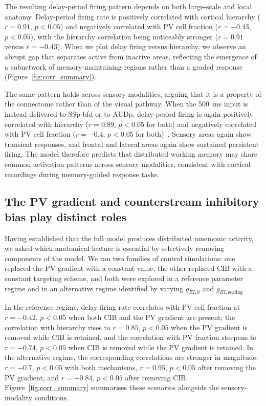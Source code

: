 \documentclass[11pt]{article}
\begin{document}
The resulting delay-period firing pattern depends on both large-scale and local anatomy. Delay-period firing rate is positively correlated with cortical hierarchy ($r=0.91$, $p<0.05$) and negatively correlated with PV cell fraction ($r=-0.43$, $p<0.05$), with the hierarchy correlation being noticeably stronger ($r=0.91$ versus $r=-0.43$). When we plot delay firing versus hierarchy, we observe an abrupt gap that separates active from inactive areas, reflecting the emergence of a subnetwork of memory-maintaining regions rather than a graded response (Figure~\ref{fig:corr_summary}).

The same pattern holds across sensory modalities, arguing that it is a property of the connectome rather than of the visual pathway. When the 500~ms input is instead delivered to SSp-bfd or to AUDp, delay-period firing is again positively correlated with hierarchy ($r=0.89$, $p<0.05$ for both) and negatively correlated with PV cell fraction ($r=-0.4$, $p<0.05$ for both)~\cite{gilad2018behavioral}. Sensory areas again show transient responses, and frontal and lateral areas again show sustained persistent firing. The model therefore predicts that distributed working memory may share common activation patterns across sensory modalities, consistent with cortical recordings during memory-guided response tasks.

\subsection{The PV gradient and counterstream inhibitory bias play distinct roles}

Having established that the full model produces distributed mnemonic activity, we asked which anatomical feature is essential by selectively removing components of the model. We ran two families of control simulations: one replaced the PV gradient with a constant value, the other replaced CIB with a constant targeting scheme, and both were explored in a reference parameter regime and in an alternative regime identified by varying $g_{EI,0}$ and $g_{EI,\text{scaling}}$.

In the reference regime, delay firing rate correlates with PV cell fraction at $r=-0.42$, $p<0.05$ when both CIB and the PV gradient are present; the correlation with hierarchy rises to $r=0.85$, $p<0.05$ when the PV gradient is removed while CIB is retained, and the correlation with PV fraction steepens to $r=-0.74$, $p<0.05$ when CIB is removed while the PV gradient is retained. In the alternative regime, the corresponding correlations are stronger in magnitude: $r=-0.7$, $p<0.05$ with both mechanisms, $r=0.95$, $p<0.05$ after removing the PV gradient, and $r=-0.84$, $p<0.05$ after removing CIB. Figure~\ref{fig:corr_summary} summarises these scenarios alongside the sensory-modality conditions.
\end{document}
